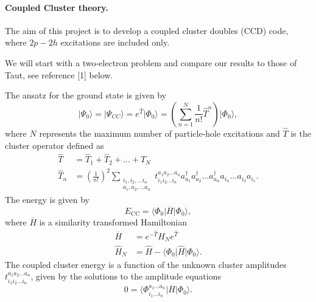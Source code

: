 \documentclass[%
oneside,                 %
final,                   %
10pt]{article}
\begin{document}
\paragraph{Coupled Cluster theory.}
The aim of this project is to develop a coupled cluster doubles (CCD)
code, where $2p-2h$ excitations are included only.

We will start with a two-electron problem and compare our results to those of Taut, see reference [1] below. 

The ansatz for the ground state  is given by
  \begin{equation*}
     \vert \Psi_0\rangle = \vert \Psi_{CC}\rangle = e^{\hat{T}} \vert
     \Phi_0\rangle = \left( \sum_{n=1}^{N} \frac{1}{n!} \hat{T}^n
     \right) \vert \Phi_0\rangle,
  \end{equation*}
  where $N$ represents the maximum number of particle-hole excitations
  and $\hat{T}$ is the cluster operator defined as
  \begin{align*}
              \hat{T} &= \hat{T}_1 + \hat{T}_2 + \ldots + \hat{T}_N
              \\ \hat{T}_n &= \left(\frac{1}{n!}\right)^2
              \sum_{\substack{ i_1,i_2,\ldots i_n \\ a_1,a_2,\ldots
                  a_n}} t_{i_1i_2\ldots i_n}^{a_1a_2\ldots a_n}
              a_{a_1}^\dagger a_{a_2}^\dagger \ldots a_{a_n}^\dagger
              a_{i_n} \ldots a_{i_2} a_{i_1}.
          \end{align*}
      The energy is given by
      \begin{equation*}
          E_{\mathrm{CC}} = \langle\Phi_0\vert \overline{H}\vert
          \Phi_0\rangle,
      \end{equation*}
      where $\overline{H}$ is a similarity transformed Hamiltonian
      \begin{align*}
          \overline{H}&= e^{-\hat{T}} \hat{H}_N e^{\hat{T}}
          \\ \hat{H}_N &= \hat{H} - \langle\Phi_0\vert \hat{H} \vert
          \Phi_0\rangle.
      \end{align*}
      The coupled cluster energy is a function of the unknown cluster
      amplitudes $t_{i_1i_2\ldots i_n}^{a_1a_2\ldots a_n}$, given by
      the solutions to the amplitude equations
      \begin{equation}\label{eq:amplitudeeq}
          0 = \langle\Phi_{i_1 \ldots i_n}^{a_1 \ldots a_n}\vert
          \overline{H}\vert \Phi_0\rangle.
      \end{equation}
\end{document}
